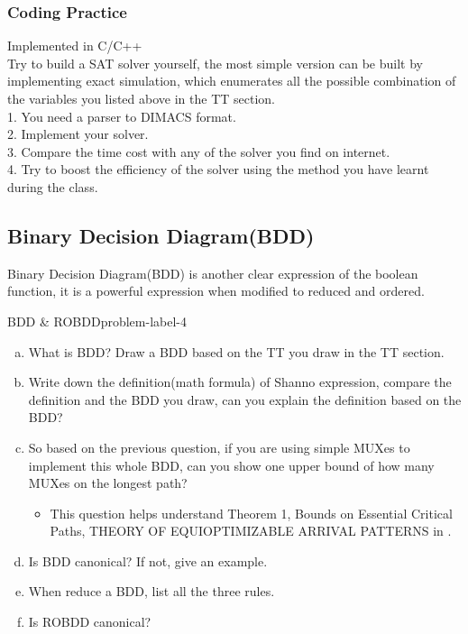 \documentclass[main.tex]{subfiles}
\begin{document}
\vspace*{4\baselineskip}
\subsubsection{Coding Practice}
Implemented in C/C++\\
Try to build a SAT solver yourself, the most simple version can be built by implementing exact simulation, which enumerates all the possible combination of the variables you listed above in the TT section.\\
1. You need a parser to DIMACS format.\\
2. Implement your solver.\\
3. Compare the time cost with any of the solver you find on internet.\\
4. Try to boost the efficiency of the solver using the method you have learnt during the class.

\subsection{Binary Decision Diagram(BDD)}
Binary Decision Diagram(BDD) is another clear expression of the boolean function, it is a powerful expression when modified to reduced and ordered.
\begin{problem}{BDD \& ROBDD}{problem-label-4}
\begin{enumerate}[(a)]
    \item What is BDD? Draw a BDD based on the TT you draw in the TT section.
    \item Write down the definition(math formula) of Shanno expression, compare the definition and the BDD you draw, can you explain the definition based on the BDD?
    \item So based on the previous question, if you are using simple MUXes to implement this whole BDD, can you show one upper bound of how many MUXes on the longest path?
    \begin{itemize}
        \item This question helps understand Theorem 1, Bounds on Essential Critical Paths, THEORY OF EQUIOPTIMIZABLE ARRIVAL PATTERNS in \cite{EnablingExactDelaySynthesis}.
    \end{itemize}
    \item Is BDD canonical? If not, give an example.
    \item When reduce a BDD, list all the three rules.
    \item Is ROBDD canonical?
\end{enumerate}
\end{problem}
\vspace*{4\baselineskip}
\end{document}
